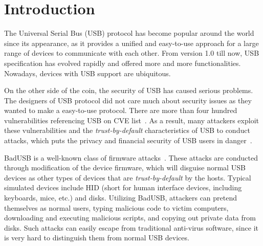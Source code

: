 \section{Introduction}
\label{sec:introduction}

The Universal Serial Bus (USB) protocol has become popular around the world since its appearance, as it provides a unified and easy-to-use approach for a large range of devices to communicate with each other.
From version 1.0 till now, USB specification has evolved rapidly and offered more and more functionalities.
Nowadays, devices with USB support are ubiquitous.

On the other side of the coin, the security of USB has caused serious problems.
The designers of USB protocol did not care much about security issues as they wanted to make a easy-to-use protocol.
There are more than four hundred vulnerabilities referencing USB on CVE list~\cite{website:CVE-list}.
As a result, many attackers exploit these vulnerabilities and the \textit{trust-by-default} characteristics of USB to conduct attacks, which puts the privacy and financial security of USB users in danger~\cite{sok}.

BadUSB is a well-known class of firmware attacks~\cite{badusb}.
These attacks are conducted through modification of the device firmware, which will disguise normal USB devices as other types of devices that are \textit{trust-by-default} by the hosts.
Typical simulated devices include HID (short for human interface devices, including keyboards, mice, etc.) and disks.
Utilizing BadUSB, attackers can pretend themselves as normal users, typing malicious code to victim computers, downloading and executing malicious scripts, and copying out private data from disks.
Such attacks can easily escape from traditional anti-virus software, since it is very hard to distinguish them from normal USB devices.

